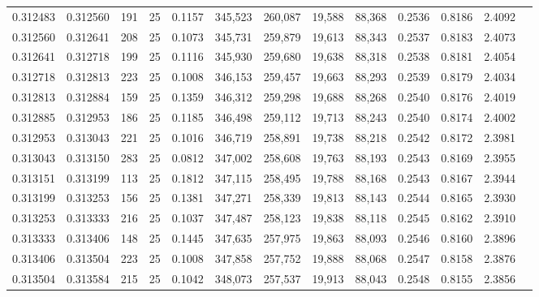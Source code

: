 \begin{tabular}{rrrrrrrrrrrrr}
0.312483 & 0.312560 &   191 &  25 &                                     0.1157 & 345,523 & 260,087 &  19,588 &  88,368 & 0.2536 & 0.8186 & 2.4092 \\
0.312560 & 0.312641 &   208 &  25 &                                     0.1073 & 345,731 & 259,879 &  19,613 &  88,343 & 0.2537 & 0.8183 & 2.4073 \\
0.312641 & 0.312718 &   199 &  25 &                                     0.1116 & 345,930 & 259,680 &  19,638 &  88,318 & 0.2538 & 0.8181 & 2.4054 \\
0.312718 & 0.312813 &   223 &  25 &                                     0.1008 & 346,153 & 259,457 &  19,663 &  88,293 & 0.2539 & 0.8179 & 2.4034 \\
0.312813 & 0.312884 &   159 &  25 &                                     0.1359 & 346,312 & 259,298 &  19,688 &  88,268 & 0.2540 & 0.8176 & 2.4019 \\
0.312885 & 0.312953 &   186 &  25 &                                     0.1185 & 346,498 & 259,112 &  19,713 &  88,243 & 0.2540 & 0.8174 & 2.4002 \\
0.312953 & 0.313043 &   221 &  25 &                                     0.1016 & 346,719 & 258,891 &  19,738 &  88,218 & 0.2542 & 0.8172 & 2.3981 \\
0.313043 & 0.313150 &   283 &  25 &                                     0.0812 & 347,002 & 258,608 &  19,763 &  88,193 & 0.2543 & 0.8169 & 2.3955 \\
0.313151 & 0.313199 &   113 &  25 &                                     0.1812 & 347,115 & 258,495 &  19,788 &  88,168 & 0.2543 & 0.8167 & 2.3944 \\
0.313199 & 0.313253 &   156 &  25 &                                     0.1381 & 347,271 & 258,339 &  19,813 &  88,143 & 0.2544 & 0.8165 & 2.3930 \\
0.313253 & 0.313333 &   216 &  25 &                                     0.1037 & 347,487 & 258,123 &  19,838 &  88,118 & 0.2545 & 0.8162 & 2.3910 \\
0.313333 & 0.313406 &   148 &  25 &                                     0.1445 & 347,635 & 257,975 &  19,863 &  88,093 & 0.2546 & 0.8160 & 2.3896 \\
0.313406 & 0.313504 &   223 &  25 &                                     0.1008 & 347,858 & 257,752 &  19,888 &  88,068 & 0.2547 & 0.8158 & 2.3876 \\
0.313504 & 0.313584 &   215 &  25 &                                     0.1042 & 348,073 & 257,537 &  19,913 &  88,043 & 0.2548 & 0.8155 & 2.3856 \\

\end{tabular}
